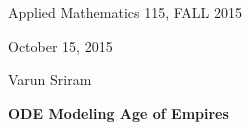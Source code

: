 \documentclass[12pt]{article}
\begin{document}
\begin{center}
Applied Mathematics 115, FALL 2015 \\




\medskip

October 15, 2015

Varun Sriram

\medskip

\textbf{ODE Modeling Age of Empires}


\end{center}
\end{document}
